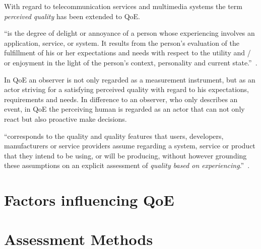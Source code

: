 With regard to telecommunication services and multimedia systems the term \emph{perceived quality} has been extended to \acf{QoE}.
\begin{definition}
``is the degree of delight or annoyance of a person whose experiencing involves an application, service, or system.
It results from the person’s evaluation of the fulfillment of his or her expectations and needs with respect to the utility and / or enjoyment in the light of the person’s context, personality and current state.''~\citep[p. 21]{moller_quality_2014}.
\end{definition}

In \ac{QoE} an observer is not only regarded as a measurement instrument, but as an actor striving for a   satisfying perceived quality with regard to his expectations, requirements and needs.
In difference to an observer, who only describes an event, in QoE the perceiving human is regarded as an actor that can not only react but also proactive make decisions.

\begin{definition}
``corresponds to the quality and quality features that users, developers, manufacturers or  service  providers assume regarding a  system, service or product that they intend to be using, or will be producing, without however grounding these assumptions on an explicit assessment of \textit{quality based on experiencing}.''~\citep[p. 20]{moller_quality_2014}.
\end{definition}


\section{Factors influencing \ac{QoE}}



\section{Assessment Methods}

